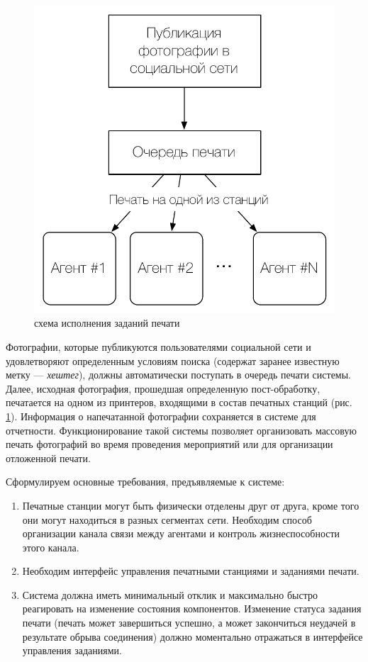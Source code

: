 \documentclass[a4paper,14pt,href]{article}
\begin{document}
\begin{figure}[htbp]
\begin{center}
  \includegraphics[scale=0.7]{print-schema.pdf}
    \caption{схема исполнения заданий печати}
    \label{fig:PrintSchema}
\end{center}
\end{figure}

Фотографии, которые публикуются пользователями социальной сети и удовлетворяют определенным условиям поиска
(содержат заранее известную метку --- \textit{хештег}), должны автоматически поступать в очередь печати системы.
Далее, исходная фотография, прошедшая определенную пост-обработку, печатается на одном из принтеров, входящими в
состав печатных станций (рис. \ref{fig:PrintSchema}). Информация о напечатанной фотографии сохраняется в системе для
отчетности. Функционирование такой системы позволяет организовать массовую печать фотографий во время проведения
мероприятий или для организации отложенной печати.

Сформулируем основные требования, предъявляемые к системе:
\begin{enumerate}
  \item Печатные станции могут быть физически отделены друг от друга, кроме того они могут находиться в разных
  сегментах сети. Необходим способ организации канала связи между агентами и контроль жизнеспособности этого канала.

  \item Необходим интерфейс управления печатными станциями и заданиями печати.

  \item Система должна иметь минимальный отклик и максимально быстро реагировать на изменение состояния компонентов.
  Изменение статуса задания печати (печать может завершиться успешно, а может закончиться неудачей в результате
  обрыва соединения) должно моментально отражаться в интерфейсе управления заданиями.
\end{enumerate}
\end{document}
